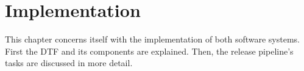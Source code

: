 \chapter{Implementation}\label{ch:implementation}

This chapter concerns itself with the implementation of both software systems.
First the DTF and its components are explained.
Then, the release pipeline's tasks are discussed in more detail.



